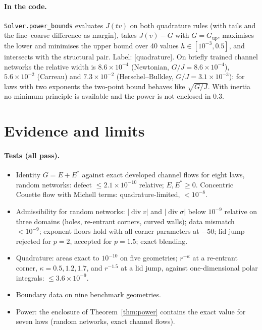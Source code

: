 \documentclass[11pt]{article}
\theoremstyle{definition}
\begin{document}
\paragraph{In the code.} \texttt{Solver.power\_bounds} evaluates $J(tv)$ on both quadrature rules (with tails and the
fine--coarse difference as margin), takes $J(v)-G$ with $G=G_{\mathrm{up}}$, maximises the lower and minimises the upper bound
over 40 values $h\in[10^{-3},0.5]$, and intersects with the structural pair. Label: [quadrature]. On briefly trained channel
networks the relative width is $8.6\times10^{-4}$ (Newtonian, $G/J=8.6\times10^{-4}$), $5.6\times10^{-2}$ (Carreau) and
$7.3\times10^{-2}$ (Herschel--Bulkley, $G/J=3.1\times10^{-3}$): for laws with two exponents the two-point bound behaves like
$\sqrt{G/J}$. With inertia no minimum principle is available and the power is not enclosed in 0.3.

\section{Evidence and limits}

\paragraph{Tests (all pass).}
\begin{itemize}
\item Identity $G=E+E^*$ against exact developed channel flows for eight laws, random networks: defect
$\le2.1\times10^{-10}$ relative; $E,E^*\ge0$. Concentric Couette flow with Michell terms: quadrature-limited, $<10^{-8}$.
\item Admissibility for random networks: $|\operatorname{div}v|$ and $|\operatorname{div}\sigma|$ below $10^{-9}$ relative on
three domains (holes, re-entrant corners, curved walls); data mismatch $<10^{-9}$; exponent floors hold with all
corner parameters at $-50$; lid jump rejected for $p=2$, accepted for $p=1.5$; exact blending.
\item Quadrature: areas exact to $10^{-10}$ on five geometries; $r^{-\kappa}$ at a re-entrant corner,
$\kappa=0.5,1.2,1.7$, and $r^{-1.5}$ at a lid jump, against one-dimensional polar integrals: $\le3.6\times10^{-9}$.
\item Boundary data on nine benchmark geometries.
\item Power: the enclosure of Theorem~\ref{thm:power} contains the exact value for seven laws (random networks, exact channel flows).
\end{itemize}
\end{document}
